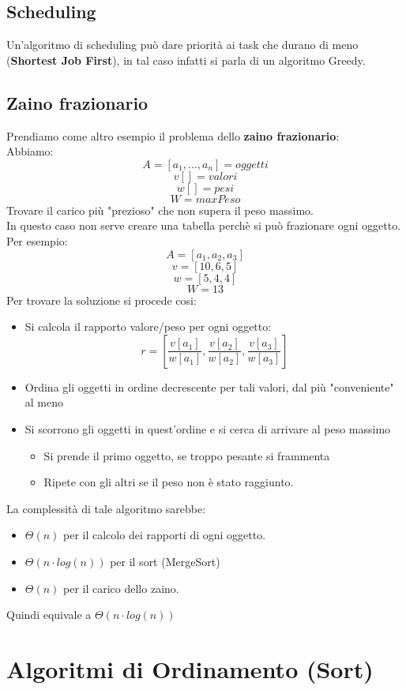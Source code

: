 \documentclass[a4paper,12pt]{article}
\let\oldsection\section
\renewcommand{\section}{\clearpage\oldsection}
\begin{document}
\subsection{Scheduling}
Un'algoritmo di scheduling può dare priorità ai task che durano di meno (\textbf{Shortest Job First}), in tal caso infatti si parla di un algoritmo Greedy.
\subsection{Zaino frazionario}
Prendiamo come altro esempio il problema dello \textbf{zaino frazionario}:\\
Abbiamo:
\[
A = [a_1,\ldots,a_n] = oggetti
\]
\[
v[] = valori
\]
\[
w[] = pesi
\]
\[
W = maxPeso
\]
Trovare il carico più "prezioso" che non supera il peso massimo.\\
In questo caso non serve creare una tabella perchè si può frazionare ogni oggetto.\\
Per esempio:
\[
A = [a_1,a_2,a_3]
\]
\[
v = [10,6,5]
\]
\[
w = [5,4,4]
\]
\[
W = 13
\]
Per trovare la soluzione si procede cosi:
\begin{itemize}
    \item Si calcola il rapporto valore/peso per ogni oggetto:
    \[
    r = [\frac{v[a_1]}{w[a_1]},\frac{v[a_2]}{w[a_2]},\frac{v[a_3]}{w[a_3]}]
    \]
    \item Ordina gli oggetti in ordine decrescente per tali valori, dal più "conveniente" al meno
    \item Si scorrono gli oggetti in quest'ordine e si cerca di arrivare al peso massimo
    \begin{itemize}
        \item Si prende il primo oggetto, se troppo pesante si frammenta
        \item Ripete con gli altri se il peso non è stato raggiunto.
    \end{itemize}
\end{itemize}
La complessità di tale algoritmo sarebbe:
\begin{itemize}
    \item $\Theta(n)$ per il calcolo dei rapporti di ogni oggetto.
    \item $\Theta(n \cdot log(n))$ per il sort (MergeSort)
    \item $\Theta(n)$ per il carico dello zaino.
\end{itemize}
Quindi equivale a $\Theta(n \cdot log(n))$

\section{Algoritmi di Ordinamento (Sort)}
\end{document}
